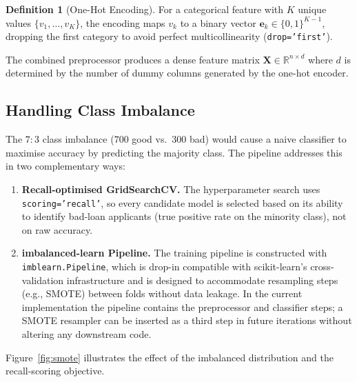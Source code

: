 \documentclass[12pt,a4paper]{article}
\theoremstyle{definition}
\newtheorem{definition}{Definition}[section]
\newcommand{\code}[1]{\texttt{#1}}
\newcommand{\bfmath}[1]{\boldsymbol{#1}}
\begin{document}
\begin{definition}[One-Hot Encoding]
  For a categorical feature with $K$ unique values $\{v_1, \ldots, v_K\}$, the
  encoding maps $v_k$ to a binary vector $\bfmath{e}_k \in \{0,1\}^{K-1}$,
  dropping the first category to avoid perfect multicollinearity (\code{drop='first'}).
\end{definition}

The combined preprocessor produces a dense feature matrix
$\bfmath{X} \in \mathbb{R}^{n \times d}$ where $d$ is determined by the number of
dummy columns generated by the one-hot encoder.

\subsection{Handling Class Imbalance}
\label{sec:smote}

The $7{:}3$ class imbalance ($700$ good vs.\ $300$ bad) would cause a naive
classifier to maximise accuracy by predicting the majority class.  The pipeline
addresses this in two complementary ways:

\begin{enumerate}
  \item \textbf{Recall-optimised GridSearchCV.}  The hyperparameter search uses
        \texttt{scoring='recall'}, so every candidate model is selected based on
        its ability to identify bad-loan applicants (true positive rate on the
        minority class), not on raw accuracy.

  \item \textbf{imbalanced-learn Pipeline.}  The training pipeline is constructed
        with \texttt{imblearn.Pipeline}, which is drop-in compatible with
        scikit-learn's cross-validation infrastructure and is designed to
        accommodate resampling steps (e.g., SMOTE) between folds without data
        leakage.  In the current implementation the pipeline contains the
        preprocessor and classifier steps; a SMOTE resampler can be inserted
        as a third step in future iterations without altering any downstream code.
\end{enumerate}

Figure~\ref{fig:smote} illustrates the effect of the imbalanced distribution
and the recall-scoring objective.
\end{document}
